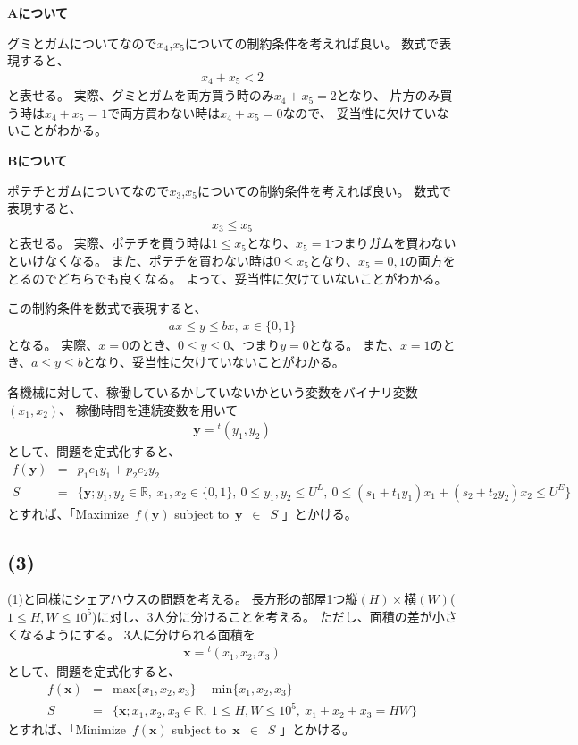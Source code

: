 \documentclass[12pt]{jarticle}
\begin{document}

\textbf{Aについて}

グミとガムについてなので$x_4$,$x_5$についての制約条件を考えれば良い。
数式で表現すると、
\begin{eqnarray}
    x_4+x_5<2\nonumber
\end{eqnarray}
と表せる。
実際、グミとガムを両方買う時のみ$x_4+x_5=2$となり、
片方のみ買う時は$x_4+x_5=1$で両方買わない時は$x_4+x_5=0$なので、
妥当性に欠けていないことがわかる。

\textbf{Bについて}

ポテチとガムについてなので$x_3$,$x_5$についての制約条件を考えれば良い。
数式で表現すると、
\begin{eqnarray}
    x_3\leq x_5\nonumber
\end{eqnarray}
と表せる。
実際、ポテチを買う時は$1\leq x_5$となり、$x_5=1$つまりガムを買わないといけなくなる。
また、ポテチを買わない時は$0 \leq x_5$となり、$x_5=0,1$の両方をとるのでどちらでも良くなる。
よって、妥当性に欠けていないことがわかる。

\clearpage

この制約条件を数式で表現すると、
\begin{eqnarray}
    ax\leq y \leq bx,\ x\in \{0,1\}\nonumber
\end{eqnarray}
となる。
実際、$x=0$のとき、$0\leq y \leq 0$、つまり$y=0$となる。
また、$x=1$のとき、$a\leq y \leq b$となり、妥当性に欠けていないことがわかる。

各機械に対して、稼働しているかしていないかという変数をバイナリ変数$(x_1,x_2)$、
稼働時間を連続変数を用いて
\begin{eqnarray}
    \boldsymbol{y}={}^t(y_1,y_2) \nonumber
\end{eqnarray}
として、問題を定式化すると、
\begin{eqnarray}
    f(\boldsymbol{y})&=&p_1e_1y_1+p_2e_2y_2\nonumber \\
    S&=&\{\boldsymbol{y}; y_1,y_2 \in \mathbb{R},\ x_1,x_2\in \{0,1\},\ 0 \leq y_1,y_2 \leq U^L,\ 0 \leq (s_1+t_1y_1)x_1+(s_2+t_2y_2)x_2\leq U^E\} \nonumber
\end{eqnarray}
とすれば、「Maximize\ $f(\boldsymbol{y})$ subject to\ $\boldsymbol{y}$\ $\in$\ $S$ 」とかける。

\subsection*{(3)}
(1)と同様にシェアハウスの問題を考える。
長方形の部屋1つ$縦(H)\times 横(W)$($1\leq H,W \leq 10^5$)に対し、3人分に分けることを考える。
ただし、面積の差が小さくなるようにする。
3人に分けられる面積を
\begin{eqnarray}
    \boldsymbol{x}={}^t(x_1,x_2,x_3) \nonumber
\end{eqnarray}
として、問題を定式化すると、
\begin{eqnarray}
    f(\boldsymbol{x})&=& \text{max}\{x_1,x_2,x_3\}-\text{min}\{x_1,x_2,x_3\} \nonumber\\
    S&=&\{\boldsymbol{x};x_1,x_2,x_3 \in \mathbb{R},\ 1\leq H,W \leq 10^5,\ x_1+x_2+x_3=HW\} \nonumber
\end{eqnarray}
とすれば、「Minimize\ $f(\boldsymbol{x})$ subject to\ $\boldsymbol{x}$\ $\in$\ $S$ 」とかける。
\end{document}
